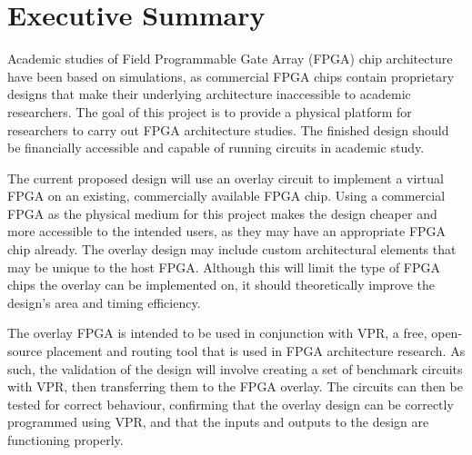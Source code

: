 \thispagestyle{empty}
\section*{Executive Summary}


Academic studies of Field Programmable Gate Array (FPGA) chip architecture have been based on simulations, as commercial FPGA chips contain proprietary designs that make their underlying architecture inaccessible to academic researchers.
The goal of this project is to provide a physical platform for researchers to carry out FPGA architecture studies.
The finished design should be financially accessible and capable of running circuits in academic study.

The current proposed design will use an overlay circuit to implement a virtual FPGA on an existing, commercially available FPGA chip.
Using a commercial FPGA as the physical medium for this project makes the design cheaper and more accessible to the intended users, as they may have an appropriate FPGA chip already.
The overlay design may include custom architectural elements that may be unique to the host FPGA.
Although this will limit the type of FPGA chips the overlay can be implemented on, it should theoretically improve the design's area and timing efficiency.

The overlay FPGA is intended to be used in conjunction with VPR, a free, open-source placement and routing tool that is used in FPGA architecture research.
As such, the validation of the design will involve creating a set of benchmark circuits with VPR, then transferring them to the FPGA overlay.
The circuits can then be tested for correct behaviour, confirming that the overlay design can be correctly programmed using VPR, and that the inputs and outputs to the design are functioning properly.